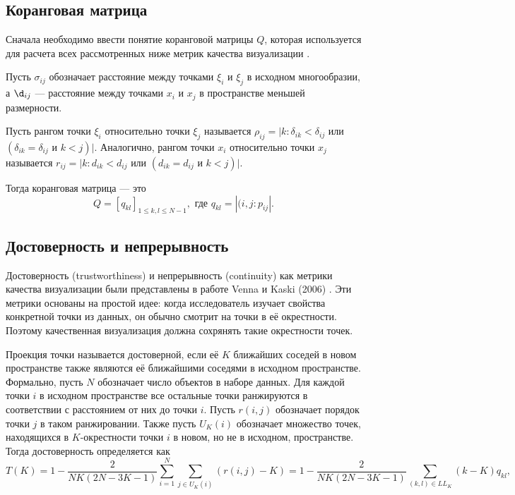 \documentclass[10pt, a4paper]{extarticle}
\renewcommand{\leq}{\leqslant}
\begin{document}
\subsection{Коранговая матрица}

Сначала необходимо ввести понятие коранговой матрицы $Q$, которая используется для расчета всех рассмотренных ниже метрик качества визуализации \cite{lee2009quality}.

 Пусть $\sigma_{ij}$ обозначает расстояние между точками $\xi_i$ и $\xi_j$ в исходном многообразии, а $\d_{ij}$ — расстояние между точками $x_i$ и $x_j$ в пространстве меньшей размерности.

 Пусть рангом точки $\xi_i$ относительно точки  $\xi_j$ называется $\rho_{ij}=| k: \delta_{i k}<\delta_{i j}$ или $\left(\delta_{i k}=\delta_{i j} \text { и } k<j\right)|$.
 Аналогично, рангом точки $x_i$ относительно точки $x_j$ называется $r_{ij}=| k: d_{i k}<d_{i j}$ или $\left(d_{i k}=d_{i j} \text { и } k<j\right)|$.

Тогда коранговая матрица — это
\[
Q = [q_{kl}]_{1\leq k, l\leq N-1}, \text{ где } q_{kl} = |{(i,j}:p_{ij}|.
\]
\subsection{Достоверность и непрерывность}

Достоверность (trustworthiness) и непрерывность (continuity) как метрики качества визуализации были представлены в работе Venna и Kaski (2006) \cite{venna2006local}. Эти метрики основаны на простой идее: когда исследователь изучает свойства конкретной точки из данных, он обычно смотрит на точки в её окрестности. Поэтому качественная визуализация должна сохрянять такие окрестности точек. 

Проекция точки называется достоверной, если её $K$ ближайших соседей в новом пространстве также являются её ближайшими соседями в исходном пространстве. Формально, пусть $N$ обозначает число объектов в наборе данных. Для каждой точки $i$ в исходном пространстве все остальные точки ранжируются в соответствии с расстоянием от них до точки $i$. Пусть $r(i, j)$ обозначает порядок точки $j$ в таком ранжировании. Также пусть $U_K(i)$ обозначает множество точек, находящихся в $K$-окрестности точки $i$ в новом, но не в исходном, пространстве. Тогда достоверность определяется как
\[
T(K) = 1 - \dfrac{2}{NK(2N - 3K - 1)}\sum_{i=1}^N \sum_{j \in U_K(i)}(r(i, j) - K) = 1-\frac{2}{NK(2N - 3K - 1)} \sum_{(k, l) \in L L_{K}}(k-K) q_{k l},
\]
\end{document}
